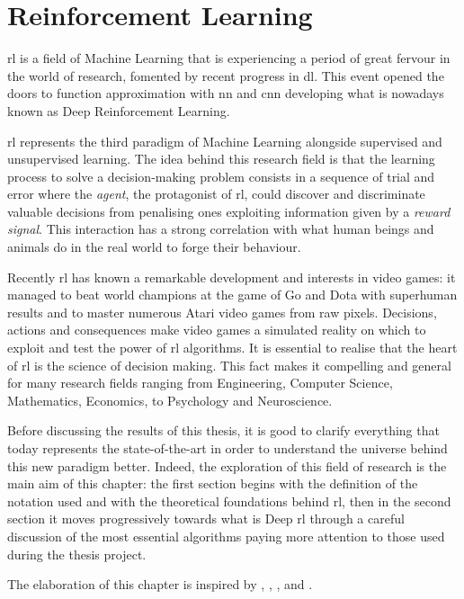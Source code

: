 
\chapter{Reinforcement Learning}

\acrfull{rl} is a field of Machine Learning that is experiencing a period of great fervour in the world of research, fomented by recent progress in \acrfull{dl}. This event opened the doors to function approximation with \acrfull{nn} and \acrfull{cnn} developing what is nowadays known as Deep Reinforcement Learning.

\acrshort{rl} represents the third paradigm of Machine Learning alongside supervised and unsupervised learning. The idea behind  this research field is that the learning process to solve a decision-making problem consists in a sequence of trial and error where the \textit{agent}, the protagonist of \acrshort{rl}, could discover and discriminate valuable decisions from penalising ones exploiting information given by a \textit{reward signal}. This interaction has a strong correlation with what human beings and animals do in the real world to forge their behaviour.

Recently \acrshort{rl} has known a remarkable development and interests in video games: it managed to beat world champions at the game of Go \cite{silver2016mastering} and Dota with superhuman results and to master numerous Atari video games \cite{mnih2013playing} from raw pixels. Decisions, actions and consequences make video games a simulated reality on which to exploit and test the power of \acrshort{rl} algorithms.
It is essential to realise that the heart of \acrshort{rl} is the science of decision making. This fact makes it compelling and general for many research fields ranging from Engineering, Computer Science, Mathematics, Economics, to Psychology and Neuroscience.

Before discussing the results of this thesis, it is good to clarify everything that today represents the state-of-the-art in order to understand the universe behind this new paradigm better. Indeed, the exploration of this field of research is the main aim of this chapter: the first section begins with the definition of the notation used and with the theoretical foundations behind \acrshort{rl}, then in the second section it moves  progressively towards what is Deep \acrshort{rl} through a careful discussion of the most essential algorithms paying more attention to those used during the thesis project.

The elaboration of this chapter is inspired by \cite{silver2015lectures}, \cite{sutton2018reinforcement}, \cite{openai2018spinningup}, \cite{lapan2018deep} and \cite{franccois2018introduction}.

